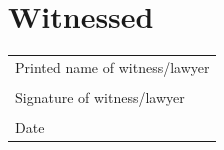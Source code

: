 \documentclass[12pt,letterpaper]{article}
\begin{document}
\section*{Witnessed}

\begin{tabular}{l}
    \vspace{0.5in} \\ \hline
    Printed name of witness/lawyer \\
    \vspace{0.5in} \\ \hline
    Signature of witness/lawyer \\
    \vspace{0.5in} \\ \hline
    Date \\
\end{tabular}
\end{document}
